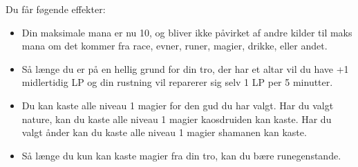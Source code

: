 Du får føgende effekter:
\begin{itemize}
    \item Din maksimale mana er nu 10, og bliver ikke påvirket af andre kilder til maks mana om det kommer fra race, evner, runer, magier, drikke, eller andet.
    \item Så længe du er på en hellig grund for din tro, der har et altar vil du have +1 midlertidig LP og din rustning vil reparerer sig selv 1 LP per 5 minutter.
    \item Du kan kaste alle niveau 1 magier for den gud du har valgt. Har du valgt nature, kan du kaste alle niveau 1 magier kaosdruiden kan kaste. Har du valgt ånder kan du kaste alle niveau 1 magier shamanen kan kaste.
    \item Så længe du kun kan kaste magier fra din tro, kan du bære runegenstande.
\end{itemize}